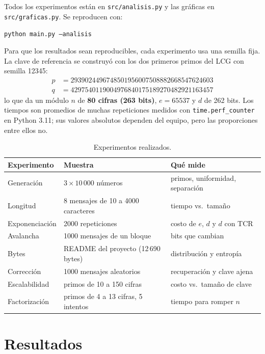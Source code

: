 \documentclass[11pt,a4paper]{article}
\begin{document}
Todos los experimentos están en \texttt{src/analisis.py} y las gráficas en
\texttt{src/graficas.py}. Se reproducen con:
\begin{center}
\texttt{python main.py --analisis}
\end{center}
Para que los resultados sean reproducibles, cada experimento usa una semilla
fija. La clave de referencia se construyó con los dos primeros primos del LCG
con semilla 12345:
\begin{align*}
p &= 2939024496748501956007508882668547624603\\
q &= 4297540119004976840175189270482921163457
\end{align*}
lo que da un módulo $n$ de \textbf{80 cifras (263 bits)}, $e = 65537$ y $d$ de
262 bits. Los tiempos son promedios de muchas repeticiones medidos con
\texttt{time.perf\_counter} en Python 3.11; sus valores absolutos dependen del
equipo, pero las proporciones entre ellos no.

\begin{table}[H]
\centering
\begin{tabular}{lll}
\toprule
Experimento & Muestra & Qué mide \\
\midrule
Generación & $3 \times 10\,000$ números & primos, uniformidad, separación \\
Longitud & 8 mensajes de 10 a 4000 caracteres & tiempo vs.\ tamaño \\
Exponenciación & 2000 repeticiones & costo de $e$, $d$ y $d$ con TCR \\
Avalancha & 1000 mensajes de un bloque & bits que cambian \\
Bytes & README del proyecto (12\,690 bytes) & distribución y entropía \\
Corrección & 1000 mensajes aleatorios & recuperación y clave ajena \\
Escalabilidad & primos de 10 a 150 cifras & costo vs.\ tamaño de clave \\
Factorización & primos de 4 a 13 cifras, 5 intentos & tiempo para romper $n$ \\
\bottomrule
\end{tabular}
\caption{Experimentos realizados.}
\end{table}

\section{Resultados}
\end{document}
